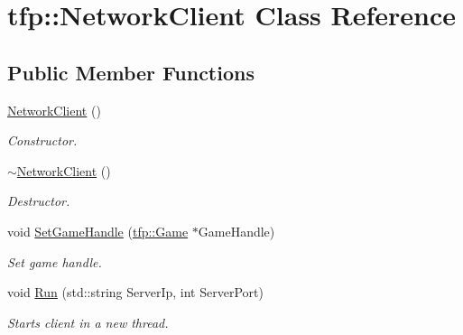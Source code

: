 \hypertarget{classtfp_1_1_network_client}{}\section{tfp\+:\+:Network\+Client Class Reference}
\label{classtfp_1_1_network_client}
\subsection*{Public Member Functions}
\begin{DoxyCompactItemize}
\item 
\mbox{\label{classtfp_1_1_network_client_a1b07ca395f5735504a988455729ae364}} 
\mbox{\hyperlink{classtfp_1_1_network_client_a1b07ca395f5735504a988455729ae364}{Network\+Client}} ()
\begin{DoxyCompactList}\small\item\em Constructor. \end{DoxyCompactList}\item 
\mbox{\label{classtfp_1_1_network_client_aa1e3a0394998e327f67b7d41a63fcf18}} 
\mbox{\hyperlink{classtfp_1_1_network_client_aa1e3a0394998e327f67b7d41a63fcf18}{$\sim$\+Network\+Client}} ()
\begin{DoxyCompactList}\small\item\em Destructor. \end{DoxyCompactList}\item 
\mbox{\label{classtfp_1_1_network_client_a894a282f89df561709478c68a30bfd41}} 
void \mbox{\hyperlink{classtfp_1_1_network_client_a894a282f89df561709478c68a30bfd41}{Set\+Game\+Handle}} (\mbox{\hyperlink{classtfp_1_1_game}{tfp\+::\+Game}} $\ast$Game\+Handle)
\begin{DoxyCompactList}\small\item\em Set game handle. \end{DoxyCompactList}\item 
\mbox{\label{classtfp_1_1_network_client_a6baa9740eb622e2fde85a07ea4dd9614}} 
void \mbox{\hyperlink{classtfp_1_1_network_client_a6baa9740eb622e2fde85a07ea4dd9614}{Run}} (std\+::string Server\+Ip, int Server\+Port)
\begin{DoxyCompactList}\small\item\em Starts client in a new thread. \end{DoxyCompactList}\item 

\end{DoxyCompactItemize}
